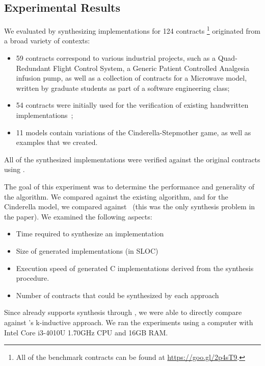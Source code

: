 \subsection{Experimental Results}
\label{sec:results}

We evaluated \jsynvg by synthesizing implementations
for 124 contracts%
\footnote{All of the benchmark contracts can be found at
\url{https://goo.gl/2p4sT9}.}
originated from a broad variety of contexts:
\begin{itemize}
\item 59 contracts correspond to various industrial projects, such as a Quad-Redundant Flight Control System, a Generic Patient Controlled Analgesia infusion pump, as well as a collection of contracts
for a Microwave model, written by graduate students as part of a software
engineering class;
\item 54 contracts were initially used for the verification of existing handwritten implementations~\cite{hagen2008scaling};
\item 11 models contain variations of the
Cinderella-Stepmother game, as well as examples that we created.
\end{itemize}
All of the synthesized implementations were verified against the original contracts using \jkind.

The goal of this experiment was to determine the performance and generality of the \jsynvg algorithm.  We compared against the existing \jsyn algorithm, and for the Cinderella model, we compared against~\cite{beyene2014constraint} (this was the only synthesis problem in the paper).  We examined the following aspects: 
\begin{itemize}
    \item Time required to synthesize an implementation
    \item Size of generated implementations (in SLOC)
    \item Execution speed of generated C implementations derived from the synthesis procedure.
    \item Number of contracts that could be synthesized by each approach
\end{itemize}
\noindent Since \jkind already supports synthesis through \jsyn, we were able to directly
compare \jsynvg against \jsyn's k-inductive approach. We
ran the experiments using a computer with Intel Core i3-4010U 1.70GHz CPU and
16GB RAM.

